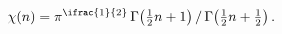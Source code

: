 \[\chi(n)=\pi^{\ifrac{1}{2}}\mathop{\Gamma\/}\nolimits\!\left(\tfrac{1}{2}n+1%
\right)/\mathop{\Gamma\/}\nolimits\!\left(\tfrac{1}{2}n+\tfrac{1}{2}\right).\]